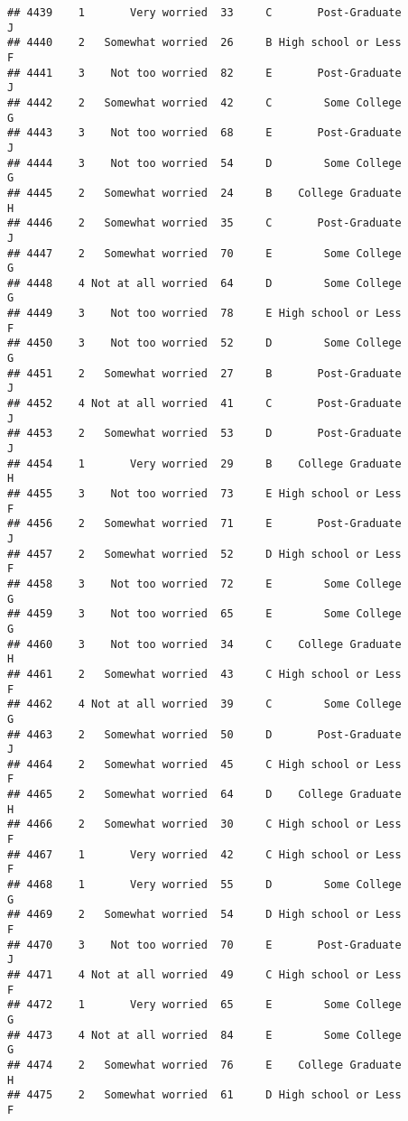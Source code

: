 \documentclass[
]{article}
\begin{document}
\begin{verbatim}
## 4439    1       Very worried  33     C       Post-Graduate         J
## 4440    2   Somewhat worried  26     B High school or Less         F
## 4441    3    Not too worried  82     E       Post-Graduate         J
## 4442    2   Somewhat worried  42     C        Some College         G
## 4443    3    Not too worried  68     E       Post-Graduate         J
## 4444    3    Not too worried  54     D        Some College         G
## 4445    2   Somewhat worried  24     B    College Graduate         H
## 4446    2   Somewhat worried  35     C       Post-Graduate         J
## 4447    2   Somewhat worried  70     E        Some College         G
## 4448    4 Not at all worried  64     D        Some College         G
## 4449    3    Not too worried  78     E High school or Less         F
## 4450    3    Not too worried  52     D        Some College         G
## 4451    2   Somewhat worried  27     B       Post-Graduate         J
## 4452    4 Not at all worried  41     C       Post-Graduate         J
## 4453    2   Somewhat worried  53     D       Post-Graduate         J
## 4454    1       Very worried  29     B    College Graduate         H
## 4455    3    Not too worried  73     E High school or Less         F
## 4456    2   Somewhat worried  71     E       Post-Graduate         J
## 4457    2   Somewhat worried  52     D High school or Less         F
## 4458    3    Not too worried  72     E        Some College         G
## 4459    3    Not too worried  65     E        Some College         G
## 4460    3    Not too worried  34     C    College Graduate         H
## 4461    2   Somewhat worried  43     C High school or Less         F
## 4462    4 Not at all worried  39     C        Some College         G
## 4463    2   Somewhat worried  50     D       Post-Graduate         J
## 4464    2   Somewhat worried  45     C High school or Less         F
## 4465    2   Somewhat worried  64     D    College Graduate         H
## 4466    2   Somewhat worried  30     C High school or Less         F
## 4467    1       Very worried  42     C High school or Less         F
## 4468    1       Very worried  55     D        Some College         G
## 4469    2   Somewhat worried  54     D High school or Less         F
## 4470    3    Not too worried  70     E       Post-Graduate         J
## 4471    4 Not at all worried  49     C High school or Less         F
## 4472    1       Very worried  65     E        Some College         G
## 4473    4 Not at all worried  84     E        Some College         G
## 4474    2   Somewhat worried  76     E    College Graduate         H
## 4475    2   Somewhat worried  61     D High school or Less         F

\end{verbatim}
\end{document}

